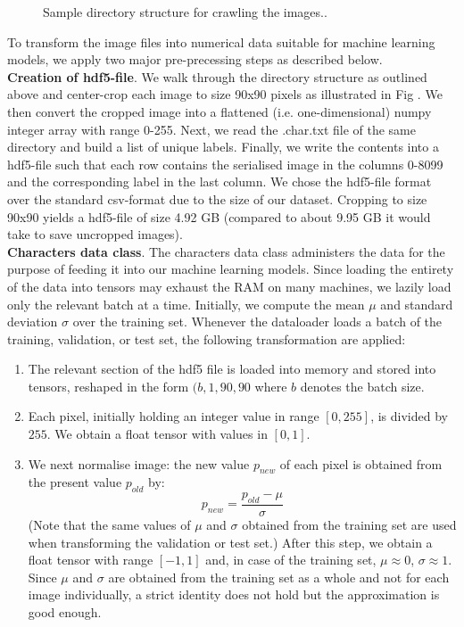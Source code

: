 \documentclass[british,12p]{article}
\begin{document}
    	\begin{figure}[hbt]
			\begin{center}
  				\caption{Sample directory structure for crawling the images..}
  				\label{fig-directory-structure}
  			\end{center}
		\end{figure}
    	
    	To transform the image files into numerical data suitable for machine learning models, we apply two major pre-precessing steps as described below.\\
    	
    	
    	\textbf{Creation of hdf5-file}. We walk through the directory structure as outlined above and center-crop each image to size 90x90 pixels as illustrated in Fig . We then convert the cropped image into a flattened (i.e. one-dimensional) numpy integer array with range 0-255. Next, we read the .char.txt file of the same directory and build a list of unique labels. Finally, we write the contents into a hdf5-file such that each row contains the serialised image in the columns 0-8099 and the corresponding label in the last column. We chose the hdf5-file format over the standard csv-format due to the size of our dataset. Cropping to size 90x90 yields a hdf5-file of size 4.92 GB (compared to about 9.95 GB it would take to save uncropped images).\\
    	
    	
    	\textbf{Characters data class}. The characters data class administers the data for the purpose of feeding it into our machine learning models. Since loading the entirety of the data into tensors may exhaust the RAM on many machines, we lazily load only the relevant batch at a time. Initially, we compute the mean $\mu$ and standard deviation $\sigma$ over the training set. Whenever the dataloader loads a batch of the training, validation, or test set, the following transformation are applied:
    	\begin{enumerate}
    		\item The relevant section of the hdf5 file is loaded into memory and stored into tensors, reshaped in the form $(b, 1, 90, 90$ where $b$ denotes the batch size.
    		\item Each pixel, initially holding an integer value in range $[0, 255]$, is divided by $255$. We obtain a float tensor with values in $[0, 1]$.
    		\item We next normalise image: the new value $p_{new}$ of each pixel is obtained from the present value $p_{old}$ by: $$ p_{new} = \frac{p_{old} - \mu}{\sigma}$$ (Note that the same values of $\mu$ and $\sigma$  obtained from the training set are used when transforming the validation or test set.) After this step, we obtain a float tensor with range $[-1, 1]$ and, in case of the training set, $\mu \approx 0$, $\sigma \approx 1$. Since $\mu$ and $\sigma$ are obtained from the training set as a whole and not for each image individually, a strict identity does not hold but the approximation is good enough.
    	\end{enumerate}
    	
\end{document}
